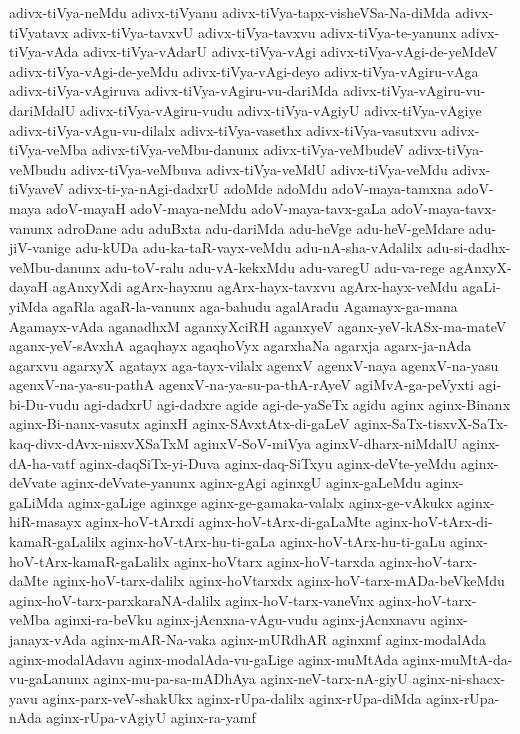 {adivx-tiVya-neMdu
adivx-tiVyanu
adivx-tiVya-tapx-visheVSa-Na-diMda
adivx-tiVyatavx
adivx-tiVya-tavxvU
adivx-tiVya-tavxvu
adivx-tiVya-te-yanunx
adivx-tiVya-vAda
adivx-tiVya-vAdarU
adivx-tiVya-vAgi
adivx-tiVya-vAgi-de-yeMdeV
adivx-tiVya-vAgi-de-yeMdu
adivx-tiVya-vAgi-deyo
adivx-tiVya-vAgiru-vAga
adivx-tiVya-vAgiruva
adivx-tiVya-vAgiru-vu-dariMda
adivx-tiVya-vAgiru-vu-dariMdalU
adivx-tiVya-vAgiru-vudu
adivx-tiVya-vAgiyU
adivx-tiVya-vAgiye
adivx-tiVya-vAgu-vu-dilalx
adivx-tiVya-vasethx
adivx-tiVya-vasutxvu
adivx-tiVya-veMba
adivx-tiVya-veMbu-danunx
adivx-tiVya-veMbudeV
adivx-tiVya-veMbudu
adivx-tiVya-veMbuva
adivx-tiVya-veMdU
adivx-tiVya-veMdu
adivx-tiVyaveV
adivx-ti-ya-nAgi-dadxrU
adoMde
adoMdu
adoV-maya-tamxna
adoV-maya
adoV-mayaH
adoV-maya-neMdu
adoV-maya-tavx-gaLa
adoV-maya-tavx-vanunx
adroDane
adu
aduBxta
adu-dariMda
adu-heVge
adu-heV-geMdare
adu-jiV-vanige
adu-kUDa
adu-ka-taR-vayx-veMdu
adu-nA-sha-vAdalilx
adu-si-dadhx-veMbu-danunx
adu-toV-ralu
adu-vA-kekxMdu
adu-varegU
adu-va-rege
agAnxyX-dayaH
agAnxyXdi
agArx-hayxnu
agArx-hayx-tavxvu
agArx-hayx-veMdu
agaLi-yiMda
agaRla
agaR-la-vanunx
aga-bahudu
agalAradu
Agamayx-ga-mana
Agamayx-vAda
aganadhxM
aganxyXciRH
aganxyeV
aganx-yeV-kASx-ma-mateV
aganx-yeV-sAvxhA
agaqhayx
agaqhoVyx
agarxhaNa
agarxja
agarx-ja-nAda
agarxvu
agarxyX
agatayx
aga-tayx-vilalx
agenxV
agenxV-naya
agenxV-na-yasu
agenxV-na-ya-su-pathA
agenxV-na-ya-su-pa-thA-rAyeV
agiMvA-ga-peVyxti
agi-bi-Du-vudu
agi-dadxrU
agi-dadxre
agide
agi-de-yaSeTx
agidu
aginx
aginx-Binanx
aginx-Bi-nanx-vasutx
aginxH
aginx-SAvxtAtx-di-gaLeV
aginx-SaTx-tisxvX-SaTx-kaq-divx-dAvx-nisxvXSaTxM
aginxV-SoV-miVya
aginxV-dharx-niMdalU
aginx-dA-ha-vatf
aginx-daqSiTx-yi-Duva
aginx-daq-SiTxyu
aginx-deVte-yeMdu
aginx-deVvate
aginx-deVvate-yanunx
aginx-gAgi
aginxgU
aginx-gaLeMdu
aginx-gaLiMda
aginx-gaLige
aginxge
aginx-ge-gamaka-valalx
aginx-ge-vAkukx
aginx-hiR-masayx
aginx-hoV-tArxdi
aginx-hoV-tArx-di-gaLaMte
aginx-hoV-tArx-di-kamaR-gaLalilx
aginx-hoV-tArx-hu-ti-gaLa
aginx-hoV-tArx-hu-ti-gaLu
aginx-hoV-tArx-kamaR-gaLalilx
aginx-hoVtarx
aginx-hoV-tarxda
aginx-hoV-tarx-daMte
aginx-hoV-tarx-dalilx
aginx-hoVtarxdx
aginx-hoV-tarx-mADa-beVkeMdu
aginx-hoV-tarx-parxkaraNA-dalilx
aginx-hoV-tarx-vaneVnx
aginx-hoV-tarx-veMba
aginxi-ra-beVku
aginx-jAcnxna-vAgu-vudu
aginx-jAcnxnavu
aginx-janayx-vAda
aginx-mAR-Na-vaka
aginx-mURdhAR
aginxmf
aginx-modalAda
aginx-modalAdavu
aginx-modalAda-vu-gaLige
aginx-muMtAda
aginx-muMtA-da-vu-gaLanunx
aginx-mu-pa-sa-mADhAya
aginx-neV-tarx-nA-giyU
aginx-ni-shacx-yavu
aginx-parx-veV-shakUkx
aginx-rUpa-dalilx
aginx-rUpa-diMda
aginx-rUpa-nAda
aginx-rUpa-vAgiyU
aginx-ra-yamf
}
